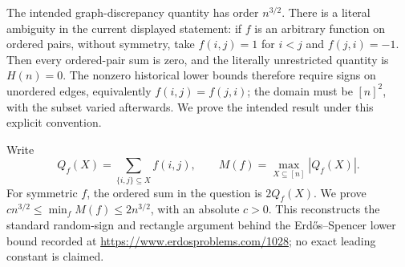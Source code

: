 The intended graph-discrepancy quantity has order $n^{3/2}$. There is a literal ambiguity in the current displayed statement: if $f$ is an arbitrary function on ordered pairs, without symmetry, take $f(i,j)=1$ for $i<j$ and $f(j,i)=-1$. Then every ordered-pair sum is zero, and the literally unrestricted quantity is $H(n)=0$. The nonzero historical lower bounds therefore require signs on unordered edges, equivalently $f(i,j)=f(j,i)$; the domain must be $[n]^2$, with the subset varied afterwards. We prove the intended result under this explicit convention.

Write
\[
 Q_f(X)=\sum_{\{i,j\}\subseteq X}f(i,j),\qquad
 M(f)=\max_{X\subseteq[n]}|Q_f(X)|.
\]
For symmetric $f$, the ordered sum in the question is $2Q_f(X)$. We prove $c n^{3/2}\le\min_fM(f)\le2n^{3/2}$, with an absolute $c>0$. This reconstructs the standard random-sign and rectangle argument behind the Erd\H{o}s--Spencer lower bound recorded at \url{https://www.erdosproblems.com/1028}; no exact leading constant is claimed.
